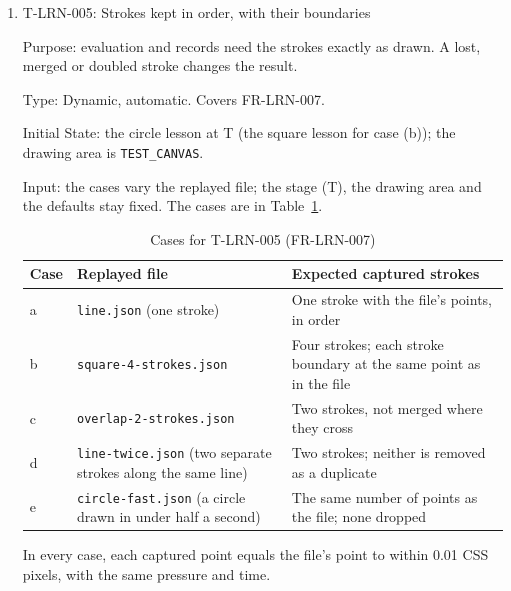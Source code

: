 \documentclass[12pt, titlepage]{article}
\newcommand{\testitem}[1]{\item #1\par\nopagebreak}
\begin{document}
\begin{enumerate}
How test will be performed: before drawing, Playwright compares a
screenshot of the empty drawing area with a reference screenshot for each
lesson and stage, approved once by the Testing Lead (Playwright
\texttt{toHaveScreenshot}). Playwright also checks that the guide layers
present match the stage. At each milestone, a tester draws at each stage on
the test iPad with the stylus and confirms what is visible.

\testitem{T-LRN-005: Strokes kept in order, with their boundaries}

Purpose: evaluation and records need the strokes exactly as drawn. A lost,
merged or doubled stroke changes the result.

Type: Dynamic, automatic. Covers FR-LRN-007.

Initial State: the circle lesson at T (the square lesson for case (b)); the
drawing area is \texttt{TEST\_CANVAS}.

Input: the cases vary the replayed file; the stage (T), the drawing area
and the defaults stay fixed. The cases are in Table~\ref{tab:t-lrn-005}.

\begin{table}[htbp]
\centering\small
\caption{Cases for T-LRN-005 (FR-LRN-007)}
\label{tab:t-lrn-005}
\begin{tabularx}{\textwidth}{@{}l >{\raggedright\arraybackslash}X
  >{\raggedright\arraybackslash}X@{}}
\toprule
\textbf{Case} & \textbf{Replayed file} &
\textbf{Expected captured strokes}\\
\midrule
a & \texttt{line.json} (one stroke) & One stroke with the file's points, in
order\\
b & \texttt{square-\allowbreak{}4-\allowbreak{}strokes.json} & Four
strokes; each stroke boundary at the same point as in the file\\
c & \texttt{overlap-\allowbreak{}2-\allowbreak{}strokes.json} & Two
strokes, not merged where they cross\\
d & \texttt{line-\allowbreak{}twice.json} (two separate strokes along the
same line) & Two strokes; neither is removed as a duplicate\\
e & \texttt{circle-\allowbreak{}fast.json} (a circle drawn in under half a
second) & The same number of points as the file; none dropped\\
\bottomrule
\end{tabularx}
\end{table}

In every case, each captured point equals the file's point to within 0.01
CSS pixels, with the same pressure and time.


\end{enumerate}
\end{document}
